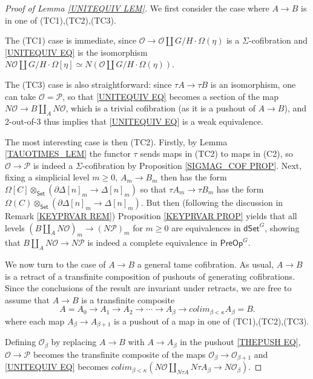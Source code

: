 \documentclass[a4paper,10pt
,draft
]{article}%
\numberwithin{equation}{section}
\numberwithin{figure}{section}
\theoremstyle{definition} %
\renewcommand{\O}{\ensuremath{\mathcal O}}
\renewcommand{\P}{\ensuremath{\mathcal P}}
\newcommand{\1}{\ensuremath{\mathbbm 1}}%
\begin{document}
\begin{proof}[Proof of Lemma \ref{UNITEQUIV LEM}]
	We first consider the case where $A\to B$ is in one of (TC1),(TC2),(TC3).
	
	The (TC1) case is immediate, 
	since $\mathcal{O} \to \mathcal{O} \amalg G/H \cdot \Omega(\eta)$ is a $\Sigma$-cofibration and
	\eqref{UNITEQUIV EQ}
	is the isomorphism
	$N\mathcal{O} \amalg G/H\cdot \Omega[\eta] \simeq 
	N\left( \mathcal{O} \amalg G/H \cdot \Omega(\eta) \right)$.
	
	The (TC3) case is also straightforward:
	since $\tau A \to \tau B$ is an isomorphism, one can take 
	$\mathcal{O}=\mathcal{P}$, so that 
	\eqref{UNITEQUIV EQ}
	becomes a section of the map
	$N \mathcal{O} \to B \amalg_{A} N \mathcal{O}$, which is a trivial cofibration (as it is a pushout of $A \to B$),
	and 2-out-of-3 thus implies that \eqref{UNITEQUIV EQ} is a weak equivalence.

	The most interesting case is then (TC2).
	Firstly, by Lemma \ref{TAUOTIMES_LEM} the functor $\tau$ sends maps in (TC2) to maps in (C2), 
	so $\O \to \P$ is indeed a $\Sigma$-cofibration
	by {\color{red} Proposition \ref{SIGMAG_COF PROP}}.
	Next, fixing a simplicial level $m\geq 0$,
	$A_m \to B_m$ then has the form
	$\Omega[C] \otimes_{\mathsf{Set}} \left(\partial \Delta[n]_m \to \Delta[n]_m\right)$ so that
	$\tau A_m \to \tau B_m$ has the form
	$\Omega(C) \otimes_{\mathsf{Set}} \left(\partial \Delta[n]_m \to \Delta[n]_m\right)$.
	But then (following the discussion in 
	Remark \ref{KEYPRVAR REM})
	Proposition \ref{KEYPRVAR PROP}
	yields that all levels
	$(B \amalg_{A} N \mathcal{O})_m
	\to 
	(N \mathcal{P})_m$
	for $m \geq 0$
	are equivalences in $\mathsf{dSet}^G$,
	showing that 
	$B \amalg_{A} N \mathcal{O}
	\to 
	N \mathcal{P}$
	is indeed a complete equivalence in
	$\mathsf{PreOp}^G$.

	We now turn to the case of $A \to B$ a general tame cofibration.
	As usual, $A \to B$ is a retract of a transfinite composition of pushouts of generating cofibrations.
	Since the conclusions of the result are invariant under retracts,
	we are free to assume that $A \to B$ is a transfinite composite
	\[
	A = A_0 \to A_1 \to A_2 \to \cdots \to A_{\beta} \to 
	colim_{\beta < \kappa} A_{\beta} = B.
	\]
	where each map $A_{\beta} \to A_{\beta +1}$ is a pushout of a map in one of (TC1),(TC2),(TC3).

	Defining $\mathcal{O}_{\beta}$ by replacing $A \to B$ with $A \to A_{\beta}$ in the pushout \eqref{THEPUSH EQ},
	$\mathcal{O} \to \mathcal{P}$ becomes the transfinite composite of the maps $\mathcal{O}_{\beta} \to \mathcal{O}_{\beta + 1}$
	and \eqref{UNITEQUIV EQ} becomes
	$
	colim_{\beta < \kappa} \left( 
	N \mathcal{O} \amalg_{N \tau A} N \tau A_{\beta}
	\to 
	N \mathcal{O}_{\beta}
	\right)
	$.


\end{proof}
\end{document}
